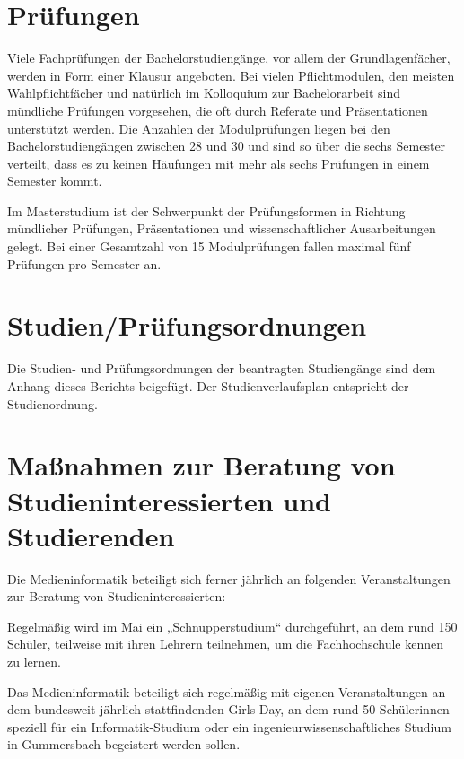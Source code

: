 \section{Prüfungen}\label{pruxfcfungen}

Viele Fachprüfungen der Bachelorstudiengänge, vor allem der
Grundlagenfächer, werden in Form einer Klausur angeboten. Bei vielen
Pflichtmodulen, den meisten Wahlpflichtfächer und natürlich im
Kolloquium zur Bachelorarbeit sind mündliche Prüfungen vorgesehen, die
oft durch Referate und Präsentationen unterstützt werden. Die Anzahlen
der Modulprüfungen liegen bei den Bachelorstudiengängen zwischen 28 und
30 und sind so über die sechs Semester verteilt, dass es zu keinen
Häufungen mit mehr als sechs Prüfungen in einem Semester kommt.

Im Masterstudium ist der Schwerpunkt der Prüfungsformen in Richtung
mündlicher Prüfungen, Präsentationen und wissenschaftlicher
Ausarbeitungen gelegt. Bei einer Gesamtzahl von 15 Modulprüfungen fallen
maximal fünf Prüfungen pro Semester an.

\section{Studien/Prüfungsordnungen}\label{studienpruxfcfungsordnungen}

Die Studien- und Prüfungsordnungen der beantragten Studiengänge sind dem
Anhang dieses Berichts beigefügt. Der Studienverlaufsplan entspricht der
Studienordnung.

\section{Maßnahmen zur Beratung von Studieninteressierten und
Studierenden}\label{mauxdfnahmen-zur-beratung-von-studieninteressierten-und-studierenden}

Die Medieninformatik beteiligt sich ferner jährlich an folgenden
Veranstaltungen zur Beratung von Studieninteressierten:

Regelmäßig wird im Mai ein „Schnupperstudium`` durchgeführt, an dem rund
150 Schüler, teilweise mit ihren Lehrern teilnehmen, um die
Fachhochschule kennen zu lernen.

Das Medieninformatik beteiligt sich regelmäßig mit eigenen
Veranstaltungen an dem bundesweit jährlich stattfindenden Girls-Day, an
dem rund 50 Schülerinnen speziell für ein Informatik-Studium oder ein
ingenieurwissenschaftliches Studium in Gummersbach begeistert werden
sollen.

